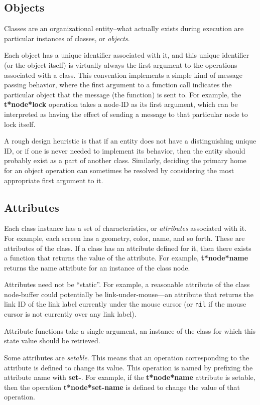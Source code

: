 \subsection{Objects} 

Classes are an organizational entity--what actually exists during
execution are particular instances of classes, or {\em objects}.

Each object has a unique identifier associated with it, and this
unique identifier (or the object itself) is virtually always the first
argument to the operations associated with a class.  This convention
implements a simple kind of message passing behavior, where the first
argument to a function call indicates the particular object that the
message (the function) is sent to.  For example, the {\bf t*node*lock}
operation takes a node-ID as its first argument, which can be
interpreted as having the effect of sending a message to that
particular node to lock itself.

A rough design heuristic is that if an entity does not have a
distinguishing unique ID, or if one is never needed to implement its
behavior, then the entity should probably exist as a part of another
class.  Similarly, deciding the primary home for an object operation
can sometimes be resolved by considering the most appropriate first
argument to it.

\subsection{Attributes}  

Each class instance has a set of characteristics, or {\em
attributes}\/ associated with it.  For example, each screen has a
geometry, color, name, and so forth.  These are attributes of the
class.  If a class has an attribute defined for it, then there exists
a function that returns the value of the attribute.  For example, {\bf
t*node*name} returns the {\sf name} attribute for an instance of the
class {\sf node}.

Attributes need not be ``static''.  For example, a reasonable
attribute of the class {\sf node-buffer} could potentially be {\sf
link-under-mouse}---an attribute that returns the link ID of the link
label currently under the mouse cursor (or {\tt nil} if the mouse
cursor is not currently over any link label).

Attribute functions take a single argument, an instance of the class
for which this state value should be retrieved.

Some attributes are {\em setable}.  This means that an operation
corresponding to the attribute is defined to change its value. This
operation is named by prefixing the attribute name with {\bf set-}.
For example, if the {\bf t*node*name} attribute is setable,
then the operation {\bf t*node*set-name} is defined to change
the value of that operation.

